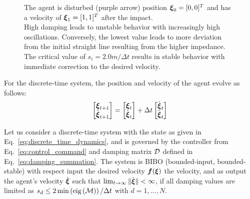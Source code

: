\begin{figure}[htbp]
{ The agent is disturbed (purple arrow) position $\boldsymbol{\xi}_0 = [0, 0]^T$ and has a velocity of  $\boldsymbol{\xi}_1 = [1, 1]^T$ after the impact. \\
  High damping leads to unstable behavior with increasingly high oscillations. Conversely, the lowest value leads to more deviation from the initial straight line resulting from the higher impedance. The critical value of $s_i = 2.0 m / \Delta t$ results in stable behavior with immediate correction to the desired velocity.}
  \label{fig:discrete_controller_parameters_comparison}
\end{figure}

For the discrete-time system, the position and velocity of the agent evolve as follows:
\begin{equation}
	\begin{bmatrix}
	 \boldsymbol{\xi}_{t+1} \\ \dot{\boldsymbol{\xi}}_{t+1}
	\end{bmatrix}
	=
	\begin{bmatrix}
	 \boldsymbol{\xi}_{t} \\ \dot{\boldsymbol{\xi}}_{t}
	\end{bmatrix}
	+ 
	\Delta t 
	\begin{bmatrix}
		\dot{\boldsymbol{\xi}}_{t} \\ \ddot{\boldsymbol{\xi}}_t 
	\end{bmatrix}
	\label{eq:discrete_time_dynamics}
\end{equation}

\begin{lemma}
	Let us consider a discrete-time system with the state as given in Eq.~\eqref{eq:discrete_time_dynamics}, and is governed by the controller from Eq.~\eqref{eq:control_command} and damping matrix $\mathcal{D}$ defined in Eq.~\eqref{eq:damping_summation}.
	The system is BIBO (bounded-input, bounded-stable) with respect input the desired velocity $\boldsymbol{f}(\boldsymbol{\xi})$ the velocity, and as output the agent's velocity $\dot{\boldsymbol{\xi}}$ such that $\lim_{t \rightarrow \infty} \| \dot{\boldsymbol{\xi}} \| < \infty$, if all damping values are limited as $s_{d} \leq 2 \min \left( \text{eig}\left(\mathcal{M}\right)  \right) / \Delta t$ with $d=1, ..., N$.
\end{lemma}

